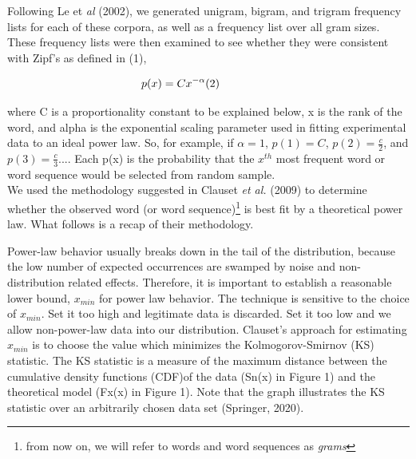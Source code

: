 \documentclass[12pt]{article}
\begin{document}
Following Le et \emph{al} (2002), we generated unigram, bigram, and trigram frequency lists for each of these corpora, as well as a frequency list over all gram sizes.  These frequency lists were then examined to see whether they were consistent with Zipf’s as defined in (1),
\setlength{\abovedisplayskip}{1pt}
\setlength{\belowdisplayskip}{1pt}
\begin{center}
\begin{equation*}
\begin{aligned}
p(x) &= Cx^{-\alpha}\hspace{4em (2)}
\end{aligned}
\end{equation*}
\end{center}
where C is a proportionality constant to be explained below, x is the rank of the word, and alpha is the exponential scaling parameter used in fitting experimental data to an ideal power law.  So, for example, if $\alpha=1$, $p(1) = C$, $p(2)=\frac{c}{2}$, and $p(3)=\frac{c}{3}$.... Each p(x) is the probability that the $x^{th}$ most frequent word or word sequence would be selected from random sample.
\\ We used the methodology suggested in Clauset \emph{et al.} (2009) to determine whether the observed word (or word sequence)\footnote[2]{from now on, we will refer to words and word sequences as \emph{grams}} is best fit by a theoretical power law. What follows is a recap of their methodology.

Power-law behavior usually breaks down in the tail of the distribution, because the low number of expected occurrences are swamped by noise and non-distribution related effects. Therefore, it is important to establish a reasonable lower bound, $x_{min}$  for power law behavior.  The technique is sensitive to the choice of $x_{min}$.  Set it too high and legitimate data is discarded.  Set it too low and we allow non-power-law data into our distribution. Clauset's approach for estimating $x_{min}$ is to choose the value which minimizes the Kolmogorov-Smirnov (KS) statistic. The KS statistic is a measure of the maximum distance between the cumulative density functions (CDF)of the data (Sn(x) in Figure 1) and the theoretical model (Fx(x) in Figure 1). Note that the graph illustrates the KS statistic over an arbitrarily chosen data set (Springer, 2020).
\end{document}
